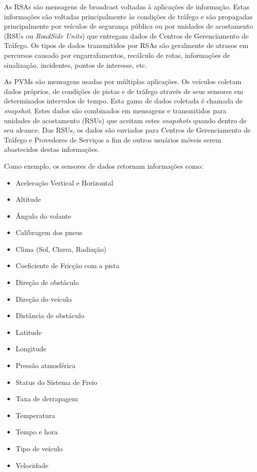 \documentclass[
12pt,				%
openright,			%
oneside,			%
a4paper,			%
brazil,				%
]{abntex2}
\begin{document}
	\par As RSAs são mensagens de broadcast voltadas à aplicações de informação. Estas informações são voltadas principalmente às condições de tráfego e são propagadas principalmente por veículos de segurança pública ou por unidades de acostamento (RSUs ou \textit{RoadSide Units}) que entregam dados de Centros de Gerenciamento de Tráfego. Os tipos de dados transmitidos por RSAs são geralmente de atrasos em percursos causado por engarrafamentos, recálculo de rotas, informações de sinalização, incidentes, pontos de interesse, etc.
	
	\par As PVMs são mensagens usadas por múltiplas aplicações. Os veículos coletam dados próprios, de condições de pistas e de tráfego através de seus sensores em determinados intervalos de tempo. Esta gama de dados coletada é chamada de \textit{snapshot}. Estes dados são combinados em mensagens e transmitidos para unidades de acostamento (RSUs) que aceitam estes \textit{snapshots}  quando dentro de seu alcance. Das RSUs, os dados são enviados para Centros de Gerenciamento de Tráfego e Provedores de Serviços a fim de outros usuários móveis serem abastecidos destas informações.
	
	\par Como exemplo, os sensores de dados retornam informações como:
	
	\begin{itemize}
		\item Aceleração Vertical e Horizontal
		\item Altitude
		\item Ângulo do volante
		\item Calibragem dos pneus
		\item Clima (Sol, Chuva, Radiação)
		\item Coeficiente de Fricção com a pista
		\item Direção de obstáculo
		\item Direção do veículo
		\item Distância de obstáculo
		\item Latitude
		\item Longitude
		\item Pressão atmosférica
		\item Status do Sistema de Freio
		\item Taxa de derrapagem
		\item Temperatura
		\item Tempo e hora
		\item Tipo de veículo
		\item Velocidade
	\end{itemize}
\end{document}
